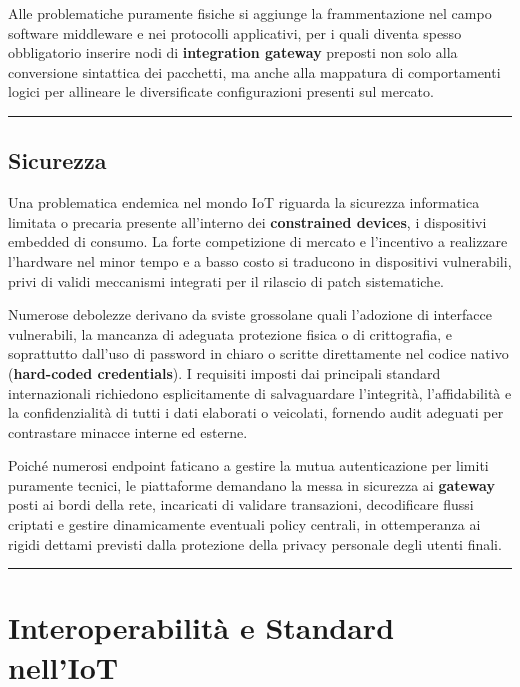 \documentclass[
  italian,
  openany]{book}
\begin{document}
Alle problematiche puramente fisiche si aggiunge la frammentazione nel
campo software middleware e nei protocolli applicativi, per i quali
diventa spesso obbligatorio inserire nodi di \textbf{integration
gateway} preposti non solo alla conversione sintattica dei pacchetti, ma
anche alla mappatura di comportamenti logici per allineare le
diversificate configurazioni presenti sul mercato.

\begin{center}\rule{0.5\linewidth}{0.5pt}\end{center}

\section{Sicurezza}\label{sicurezza-1}

Una problematica endemica nel mondo IoT riguarda la sicurezza
informatica limitata o precaria presente all'interno dei
\textbf{constrained devices}, i dispositivi embedded di consumo. La
forte competizione di mercato e l'incentivo a realizzare l'hardware nel
minor tempo e a basso costo si traducono in dispositivi vulnerabili,
privi di validi meccanismi integrati per il rilascio di patch
sistematiche.

Numerose debolezze derivano da sviste grossolane quali l'adozione di
interfacce vulnerabili, la mancanza di adeguata protezione fisica o di
crittografia, e soprattutto dall'uso di password in chiaro o scritte
direttamente nel codice nativo (\textbf{hard-coded credentials}). I
requisiti imposti dai principali standard internazionali richiedono
esplicitamente di salvaguardare l'integrità, l'affidabilità e la
confidenzialità di tutti i dati elaborati o veicolati, fornendo audit
adeguati per contrastare minacce interne ed esterne.

Poiché numerosi endpoint faticano a gestire la mutua autenticazione per
limiti puramente tecnici, le piattaforme demandano la messa in sicurezza
ai \textbf{gateway} posti ai bordi della rete, incaricati di validare
transazioni, decodificare flussi criptati e gestire dinamicamente
eventuali policy centrali, in ottemperanza ai rigidi dettami previsti
dalla protezione della privacy personale degli utenti finali.

\begin{center}\rule{0.5\linewidth}{0.5pt}\end{center}

\newpage

\chapter{Interoperabilità e Standard
nell'IoT}\label{interoperabilituxe0-e-standard-nelliot}
\end{document}
